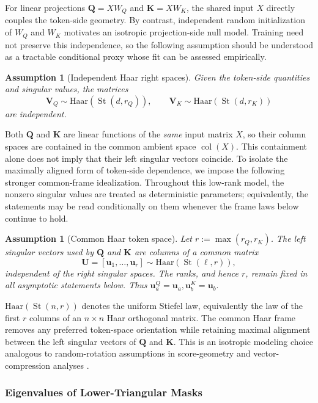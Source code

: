 \documentclass{article}
\newcommand{\St}{\operatorname{St}}
\newcommand{\bQ}{\mathbf{Q}}
\newcommand{\bK}{\mathbf{K}}
\newcommand{\bU}{\mathbf{U}}
\newcommand{\bV}{\mathbf{V}}
\newcommand{\bu}{\mathbf{u}}
\newtheorem{assumption}[theorem]{Assumption}
\theoremstyle{definition}
\theoremstyle{remark}
\begin{document}
For linear projections $\bQ=XW_Q$ and $\bK=XW_K$, the shared input $X$
directly couples the token-side geometry.  By contrast, independent random
initialization of $W_Q$ and $W_K$ motivates an isotropic projection-side null
model.  Training need not preserve this independence, so the following
assumption should be understood as a tractable conditional proxy whose fit can
be assessed empirically.
\begin{assumption}[Independent Haar right spaces]
Given the token-side quantities and singular values, the matrices
\[
        \bV_Q\sim \mathrm{Haar}(\St(d,r_Q)),
        \qquad
        \bV_K\sim \mathrm{Haar}(\St(d,r_K))
\]
are independent.
\label{ass:haar}
\end{assumption}

Both \(\bQ\) and \(\bK\) are linear functions of the \emph{same} input matrix
\(X\), so their column spaces are contained in the common ambient space
\(\operatorname{col}(X)\).  This containment alone does not imply that their
left singular vectors coincide.  To isolate the maximally aligned form of
token-side dependence, we impose the following stronger common-frame
idealization.  Throughout this low-rank model, the nonzero singular values are
treated as deterministic parameters; equivalently, the statements may be read
conditionally on them whenever the frame laws below continue to hold.

\begin{assumption}[Common Haar token space]
Let $r:=\max(r_Q,r_K)$.  The left singular vectors used by $\bQ$ and $\bK$
are columns of a common matrix
\[
    \bU=[\bu_1,\ldots,\bu_r]\sim \mathrm{Haar}(\St(\ell,r)),
\]
independent of the right singular spaces.  The ranks, and hence $r$, remain
fixed in all asymptotic statements below.  Thus
\(
    \bu^Q_a=\bu_a,  
    \bu^K_b=\bu_b.
\)
\label{ass:common-left-haar}
\end{assumption}

$\mathrm{Haar}(\St(n,r))$ denotes the uniform Stiefel law, equivalently the
law of the first $r$ columns of an $n\times n$ Haar orthogonal matrix.  The
common Haar frame removes any preferred token-space orientation while retaining
maximal alignment between the left singular vectors of $\bQ$ and $\bK$.  This
is an isotropic modeling choice analogous to random-rotation assumptions in
score-geometry and vector-compression analyses
\citep{RaBitQ24,RaBitQ25,zandieh2026turboquant,li:2026spectral}.

\subsubsection{Eigenvalues of Lower-Triangular Masks}
\end{document}
